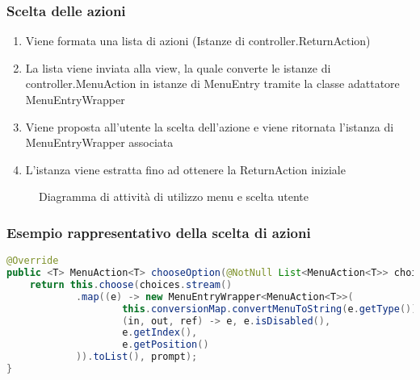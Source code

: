 \begin{frame}
    \frametitle{Scelta delle azioni}

    \begin{minipage}{.49\textwidth}
        \begin{enumerate}
            \item<1-> Viene formata una lista di azioni (Istanze di controller.ReturnAction)
            \item<2-> La lista viene inviata alla view, la quale converte le istanze di controller.MenuAction in istanze di MenuEntry tramite la classe adattatore MenuEntryWrapper
            \item<3-> Viene proposta all'utente la scelta dell'azione e viene ritornata l'istanza di MenuEntryWrapper associata
            \item <4-> L'istanza viene estratta fino ad ottenere la ReturnAction iniziale
        \end{enumerate}
    \end{minipage}
    \begin{minipage}{.49\textwidth}
        \begin{figure}
            \centering
            \caption{Diagramma di attività di utilizzo menu e scelta utente}
        \end{figure}
    \end{minipage}
\end{frame}

\begin{frame}[fragile]
    \frametitle{Esempio rappresentativo della scelta di azioni}
    \lstset{style=java}
    \begin{lstlisting}[language=java, caption={Snippet tratto da StreamView\#chooseOption()}]
@Override
public <T> MenuAction<T> chooseOption(@NotNull List<MenuAction<T>> choices, PromptType prompt) {
    return this.choose(choices.stream()
            .map((e) -> new MenuEntryWrapper<MenuAction<T>>(
                    this.conversionMap.convertMenuToString(e.getType()),
                    (in, out, ref) -> e, e.isDisabled(),
                    e.getIndex(),
                    e.getPosition()
            )).toList(), prompt);
}
    \end{lstlisting}
\end{frame}

